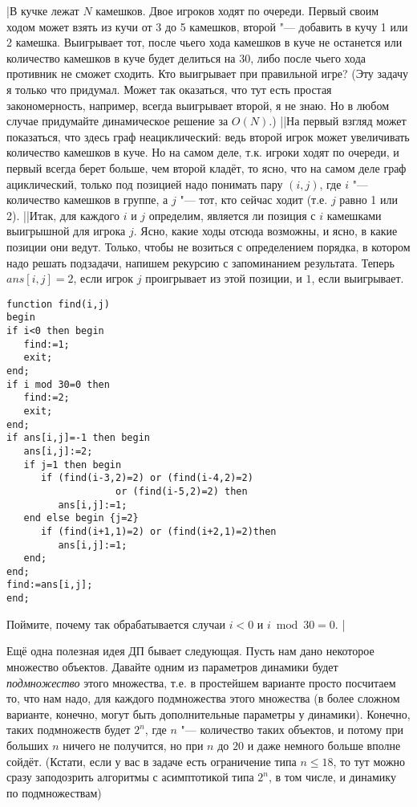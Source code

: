 \task|В кучке лежат $N$ камешков. Двое игроков ходят по очереди. Первый своим ходом может взять из кучи
от 3 до 5 камешков, второй "--- добавить в кучу 1 или 2 камешка. Выигрывает тот, после чьего хода 
камешков в куче не останется или количество камешков в куче будет делиться на 30, либо после чьего хода противник не сможет сходить. Кто выигрывает
при правильной игре? (Эту задачу я только что придумал. Может так оказаться, что тут есть простая закономерность,
например, всегда выигрывает второй, я не знаю. Но в любом случае придумайте динамическое решение за $O(N)$.)
||На первый взгляд может показаться, что здесь граф неациклический: ведь второй игрок может увеличивать количество камешков в куче. Но на самом деле, т.к. игроки ходят по очереди, и первый всегда берет больше, чем второй кладёт, то ясно, что на самом деле граф ациклический, только под позицией надо понимать пару $(i,j)$, где $i$ "--- количество камешков в группе, а $j$ "--- тот, кто сейчас ходит (т.е. $j$ равно 1 или 2).
||Итак, для каждого $i$ и $j$ определим, является ли позиция с $i$ камешками выигрышной для игрока $j$. Ясно, какие ходы отсюда возможны, и ясно, в какие позиции они ведут. Только, чтобы не возиться с определением порядка, в котором надо решать подзадачи, напишем рекурсию с запоминанием результата. Теперь $ans[i,j]=2$, если игрок $j$ проигрывает из этой позиции, и $1$, если выигрывает.
\begin{codesample}\begin{verbatim}
function find(i,j)
begin
if i<0 then begin
   find:=1;
   exit;
end;
if i mod 30=0 then
   find:=2;
   exit;
end;
if ans[i,j]=-1 then begin
   ans[i,j]:=2;
   if j=1 then begin
      if (find(i-3,2)=2) or (find(i-4,2)=2) 
                   or (find(i-5,2)=2) then
         ans[i,j]:=1;
   end else begin {j=2}
      if (find(i+1,1)=2) or (find(i+2,1)=2)then
         ans[i,j]:=1;
   end;
end;
find:=ans[i,j];
end;
\end{verbatim}\end{codesample}
Поймите, почему так обрабатывается случаи $i<0$ и $i\bmod 30=0$.
|

 Ещё одна полезная идея ДП бывает следующая. Пусть нам дано некоторое
множество объектов. Давайте одним из параметров динамики будет \textit{подмножество} этого
множества, т.е. в простейшем варианте просто посчитаем то, что нам надо, для каждого подмножества
этого множества (в более сложном варианте, конечно, могут быть дополнительные параметры у динамики).
Конечно, таких подмножеств будет $2^n$, где $n$ "--- количество таких объектов, и потому при больших
$n$ ничего не получится, но при $n$ до $20$ и даже немного больше вполне сойдёт.
(Кстати, если у вас в задаче есть ограничение типа $n\leq 18$, то тут можно сразу 
заподозрить алгоритмы с асимптотикой типа $2^n$, в том числе, и динамику по подмножествам)

